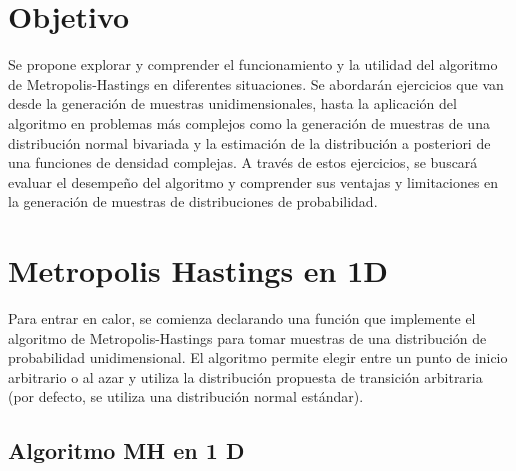 \documentclass[
]{article}
\begin{document}
\hypertarget{objetivo}{%
\section{Objetivo}\label{objetivo}}

Se propone explorar y comprender el funcionamiento y la utilidad del
algoritmo de Metropolis-Hastings en diferentes situaciones. Se abordarán
ejercicios que van desde la generación de muestras unidimensionales,
hasta la aplicación del algoritmo en problemas más complejos como la
generación de muestras de una distribución normal bivariada y la
estimación de la distribución a posteriori de una funciones de densidad
complejas. A través de estos ejercicios, se buscará evaluar el desempeño
del algoritmo y comprender sus ventajas y limitaciones en la generación
de muestras de distribuciones de probabilidad.

\newpage

\hypertarget{metropolis-hastings-en-1d}{%
\section{Metropolis Hastings en 1D}\label{metropolis-hastings-en-1d}}

Para entrar en calor, se comienza declarando una función que implemente
el algoritmo de Metropolis-Hastings para tomar muestras de una
distribución de probabilidad unidimensional. El algoritmo permite elegir
entre un punto de inicio arbitrario o al azar y utiliza la distribución
propuesta de transición arbitraria (por defecto, se utiliza una
distribución normal estándar).

\hypertarget{algoritmo-mh-en-1-d}{%
\subsection{Algoritmo MH en 1 D}\label{algoritmo-mh-en-1-d}}
\end{document}
